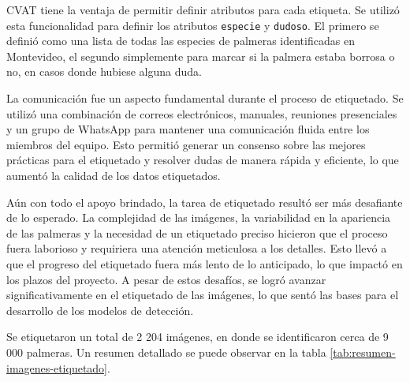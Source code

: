 CVAT tiene la ventaja de permitir definir atributos para cada etiqueta. Se utilizó esta funcionalidad para definir los atributos \texttt{especie} y \texttt{dudoso}. El primero se definió como una lista de todas las especies de palmeras identificadas en Montevideo, el segundo simplemente para marcar si la palmera estaba borrosa o no, en casos donde hubiese alguna duda.

La comunicación fue un aspecto fundamental durante el proceso de etiquetado. Se utilizó una combinación de correos electrónicos, manuales, reuniones presenciales y un grupo de WhatsApp para mantener una comunicación fluida entre los miembros del equipo. Esto permitió generar un consenso sobre las mejores prácticas para el etiquetado y resolver dudas de manera rápida y eficiente, lo que aumentó la calidad de los datos etiquetados.

Aún con todo el apoyo brindado, la tarea de etiquetado resultó ser más desafiante de lo esperado. La complejidad de las imágenes, la variabilidad en la apariencia de las palmeras y la necesidad de un etiquetado preciso hicieron que el proceso fuera laborioso y requiriera una atención meticulosa a los detalles. Esto llevó a que el progreso del etiquetado fuera más lento de lo anticipado, lo que impactó en los plazos del proyecto. A pesar de estos desafíos, se logró avanzar significativamente en el etiquetado de las imágenes, lo que sentó las bases para el desarrollo de los modelos de detección.

Se etiquetaron un total de 2 204 imágenes, en donde se identificaron cerca de 9 000 palmeras. Un resumen detallado se puede observar en la tabla \ref{tab:resumen-imagenes-etiquetado}.

